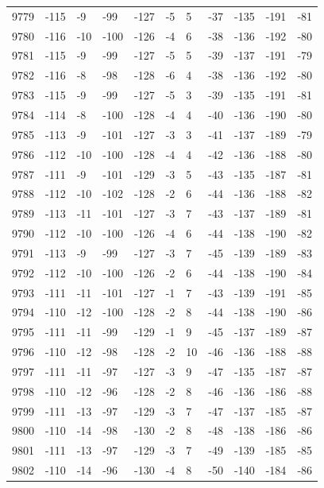 \begin{table}[H]
\begin{tabular}{lllllllllll}
9779 & -115 & -9 & -99 & -127 & -5 & 5 & -37 & -135 & -191 & -81 \\
9780 & -116 & -10 & -100 & -126 & -4 & 6 & -38 & -136 & -192 & -80 \\
9781 & -115 & -9 & -99 & -127 & -5 & 5 & -39 & -137 & -191 & -79 \\
9782 & -116 & -8 & -98 & -128 & -6 & 4 & -38 & -136 & -192 & -80 \\
9783 & -115 & -9 & -99 & -127 & -5 & 3 & -39 & -135 & -191 & -81 \\
9784 & -114 & -8 & -100 & -128 & -4 & 4 & -40 & -136 & -190 & -80 \\
9785 & -113 & -9 & -101 & -127 & -3 & 3 & -41 & -137 & -189 & -79 \\
9786 & -112 & -10 & -100 & -128 & -4 & 4 & -42 & -136 & -188 & -80 \\
9787 & -111 & -9 & -101 & -129 & -3 & 5 & -43 & -135 & -187 & -81 \\
9788 & -112 & -10 & -102 & -128 & -2 & 6 & -44 & -136 & -188 & -82 \\
9789 & -113 & -11 & -101 & -127 & -3 & 7 & -43 & -137 & -189 & -81 \\
9790 & -112 & -10 & -100 & -126 & -4 & 6 & -44 & -138 & -190 & -82 \\
9791 & -113 & -9 & -99 & -127 & -3 & 7 & -45 & -139 & -189 & -83 \\
9792 & -112 & -10 & -100 & -126 & -2 & 6 & -44 & -138 & -190 & -84 \\
9793 & -111 & -11 & -101 & -127 & -1 & 7 & -43 & -139 & -191 & -85 \\
9794 & -110 & -12 & -100 & -128 & -2 & 8 & -44 & -138 & -190 & -86 \\
9795 & -111 & -11 & -99 & -129 & -1 & 9 & -45 & -137 & -189 & -87 \\
9796 & -110 & -12 & -98 & -128 & -2 & 10 & -46 & -136 & -188 & -88 \\
9797 & -111 & -11 & -97 & -127 & -3 & 9 & -47 & -135 & -187 & -87 \\
9798 & -110 & -12 & -96 & -128 & -2 & 8 & -46 & -136 & -186 & -88 \\
9799 & -111 & -13 & -97 & -129 & -3 & 7 & -47 & -137 & -185 & -87 \\
9800 & -110 & -14 & -98 & -130 & -2 & 8 & -48 & -138 & -186 & -86 \\
9801 & -111 & -13 & -97 & -129 & -3 & 7 & -49 & -139 & -185 & -85 \\
9802 & -110 & -14 & -96 & -130 & -4 & 8 & -50 & -140 & -184 & -86 \\

\end{tabular}
\end{table}
